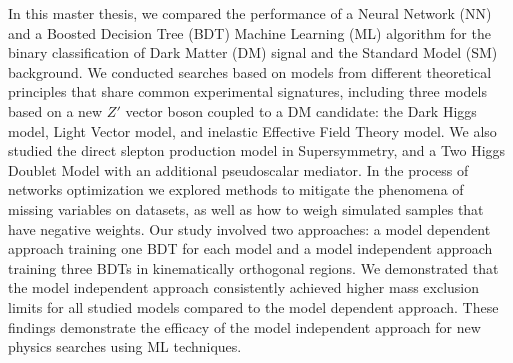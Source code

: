 \documentclass[12pt, a4paper]{book}
\begin{document}
In this master thesis, we compared the performance of a Neural Network (NN) and a Boosted Decision Tree (BDT) Machine Learning (ML) algorithm for the binary classification of Dark Matter (DM) signal and the Standard Model (SM) background. We conducted searches based on models from different theoretical principles that share common experimental signatures, 
including three models based on a new $Z'$ vector boson coupled to a DM candidate: the Dark Higgs model, Light Vector model, and inelastic Effective Field Theory model. We also studied the direct slepton production model in Supersymmetry, and a Two Higgs Doublet Model with an additional pseudoscalar mediator. 
In the process of networks optimization we explored methods to mitigate the phenomena of missing variables on datasets, as well as how to weigh simulated samples that have negative weights. Our study involved two approaches: a model dependent 
approach training one BDT for each model and a model independent approach training three BDTs in kinematically orthogonal regions. We demonstrated that the model independent approach consistently achieved higher mass exclusion limits for all studied models compared to the model dependent approach. 
These findings demonstrate the efficacy of the model independent approach for new physics searches using ML techniques.
\end{document}
